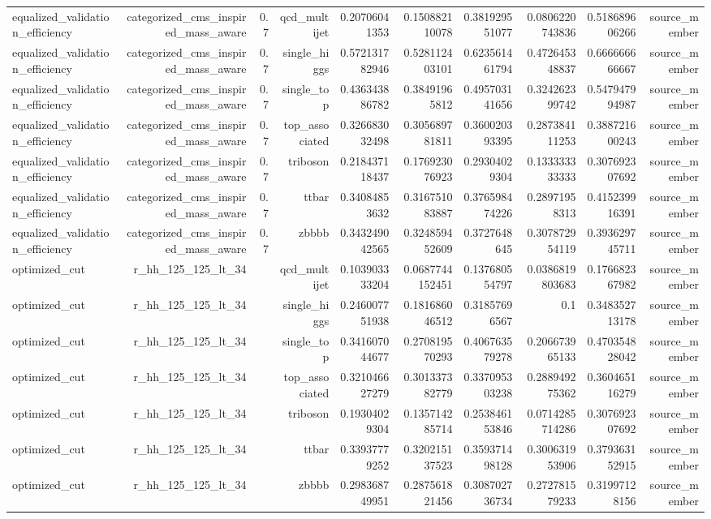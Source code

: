\begin{table}[htbp]
{\begin{tabular}{lrrrrrrrrr}
equalized\_validation\_efficiency & categorized\_cms\_inspired\_mass\_aware & 0.7 & qcd\_multijet & 0.20706041353 & 0.150882110078 & 0.381929551077 & 0.0806220743836 & 0.518689606266 & source\_member \\
equalized\_validation\_efficiency & categorized\_cms\_inspired\_mass\_aware & 0.7 & single\_higgs & 0.572131782946 & 0.528112403101 & 0.623561461794 & 0.472645348837 & 0.666666666667 & source\_member \\
equalized\_validation\_efficiency & categorized\_cms\_inspired\_mass\_aware & 0.7 & single\_top & 0.436343886782 & 0.38491965812 & 0.495703141656 & 0.324262399742 & 0.547947994987 & source\_member \\
equalized\_validation\_efficiency & categorized\_cms\_inspired\_mass\_aware & 0.7 & top\_associated & 0.326683032498 & 0.305689781811 & 0.360020393395 & 0.287384111253 & 0.388721600243 & source\_member \\
equalized\_validation\_efficiency & categorized\_cms\_inspired\_mass\_aware & 0.7 & triboson & 0.218437118437 & 0.176923076923 & 0.29304029304 & 0.133333333333 & 0.307692307692 & source\_member \\
equalized\_validation\_efficiency & categorized\_cms\_inspired\_mass\_aware & 0.7 & ttbar & 0.34084853632 & 0.316751083887 & 0.376598474226 & 0.28971958313 & 0.415239916391 & source\_member \\
equalized\_validation\_efficiency & categorized\_cms\_inspired\_mass\_aware & 0.7 & zbbbb & 0.343249042565 & 0.324859452609 & 0.3727648645 & 0.307872954119 & 0.393629745711 & source\_member \\
optimized\_cut & r\_hh\_125\_125\_lt\_34 &  & qcd\_multijet & 0.103903333204 & 0.0687744152451 & 0.137680554797 & 0.0386819803683 & 0.176682367982 & source\_member \\
optimized\_cut & r\_hh\_125\_125\_lt\_34 &  & single\_higgs & 0.246007751938 & 0.181686046512 & 0.31857696567 & 0.1 & 0.348352713178 & source\_member \\
optimized\_cut & r\_hh\_125\_125\_lt\_34 &  & single\_top & 0.341607044677 & 0.270819570293 & 0.406763579278 & 0.206673965133 & 0.470354828042 & source\_member \\
optimized\_cut & r\_hh\_125\_125\_lt\_34 &  & top\_associated & 0.321046627279 & 0.301337382779 & 0.337095303238 & 0.288949275362 & 0.360465116279 & source\_member \\
optimized\_cut & r\_hh\_125\_125\_lt\_34 &  & triboson & 0.19304029304 & 0.135714285714 & 0.253846153846 & 0.0714285714286 & 0.307692307692 & source\_member \\
optimized\_cut & r\_hh\_125\_125\_lt\_34 &  & ttbar & 0.33937779252 & 0.320215137523 & 0.359371498128 & 0.300631953906 & 0.379363152915 & source\_member \\
optimized\_cut & r\_hh\_125\_125\_lt\_34 &  & zbbbb & 0.298368749951 & 0.287561821456 & 0.308702736734 & 0.272781579233 & 0.31997128156 & source\_member \\
\bottomrule
\end{tabular}
}
\end{table}
